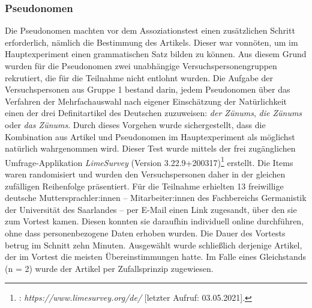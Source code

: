 \subsubsection{Pseudonomen}\label{abs:Auswahl-Nom}
Die Pseudonomen machten vor dem Assoziationstest einen zusätzlichen Schritt erforderlich, nämlich die Bestimmung des Artikels. Dieser war vonnöten, um im Hauptexperiment einen grammatischen Satz bilden zu können. Aus diesem Grund wurden für die Pseudonomen zwei unabhängige Versuchspersonengruppen rekrutiert, die für die Teilnahme nicht entlohnt wurden. Die Aufgabe der Versuchspersonen aus {Gruppe 1} bestand darin, jedem Pseudonomen über das Verfahren der Mehrfachauswahl nach eigener Einschätzung der Natürlichkeit einen der drei Definitartikel des Deutschen zuzuweisen: \textit{der Zünums}, \textit{die Zünums} oder \textit{das Zünums}. Durch dieses Vorgehen wurde sichergestellt, dass die Kombination aus Artikel und Pseudonomen im Hauptexperiment als möglichst natürlich wahrgenommen wird.
Dieser Test wurde mittels der frei zugänglichen Umfrage-Applikation \textit{LimeSurvey} ({Version 3.22.9+200317})\footnote{\citet[]{LimeSurvey.2012}: \textit{https://www.limesurvey.org/de/} [letzter Aufruf: 03.05.2021].} erstellt. Die Items waren randomisiert und wurden den Versuchspersonen daher in der gleichen zufälligen Reihenfolge präsentiert. Für die Teilnahme erhielten 13 freiwillige deutsche Muttersprachler:innen -- Mitarbeiter:innen des Fachbereichs Germanistik der Universität des Saarlandes -- per E-Mail einen Link zugesandt, über den sie zum Vortest kamen. Diesen konnten sie daraufhin individuell online durchführen, ohne dass personenbezogene Daten erhoben wurden. Die Dauer des Vortests betrug im Schnitt zehn Minuten. Ausgewählt wurde schließlich derjenige Artikel, der im Vortest die meisten Übereinstimmungen hatte. Im Falle eines Gleichstands (n = 2) wurde der Artikel per Zufallsprinzip zugewiesen.


